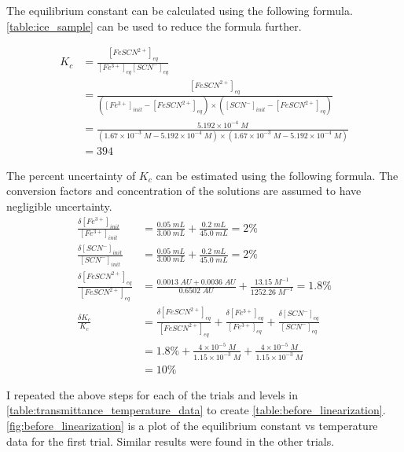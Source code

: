 \noindent
The equilibrium constant can be calculated using the following formula. \cref{table:ice_sample} can be used to reduce the formula further.

\begin{align}
    K_c &= \frac{[FeSCN^{2+}]_{eq}}{[Fe^{3+}]_{eq} [SCN^-]_{eq}} \\
    &= \frac{[FeSCN^{2+}]_{eq}}{([Fe^{3+}]_{init} - [FeSCN^{2+}]_{eq}) \times ([SCN^-]_{init} - [FeSCN^{2+}]_{eq})} \\
    &= \frac{5.192 \times 10^{-4} \; M}{(1.67 \times 10^{-3} \; M - 5.192 \times 10^{-4} \; M) \times (1.67 \times 10^{-3} \; M - 5.192 \times 10^{-4} \; M)} \\
    &= 394
\end{align}

\noindent
The percent uncertainty of \(K_c\) can be estimated using the following formula. The conversion factors and concentration of the solutions are assumed to have negligible uncertainty.
\begin{align}
    \frac{\delta [Fe^{3+}]_{init}}{[Fe^{3+}]_{init}} &= \frac{0.05 \; mL}{3.00 \; mL} + \frac{0.2 \; mL}{45.0 \; mL} = 2\% \\
    \frac{\delta [SCN^-]_{init}}{[SCN^-]_{init}} &= \frac{0.05 \; mL}{3.00 \; mL} + \frac{0.2 \; mL}{45.0 \; mL} = 2\% \\
    \frac{\delta [FeSCN^{2+}]_{eq}}{[FeSCN^{2+}]_{eq}} &= \frac{0.0013 \; AU + 0.0036 \; AU}{0.6502 \; AU} + \frac{13.15 \; M^{-1}}{1252.26 \; M^{-1}} = 1.8\% \\
    \frac{\delta K_c}{K_c} &= \frac{\delta [FeSCN^{2+}]_{eq}}{[FeSCN^{2+}]_{eq}} + \frac{\delta [Fe^{3+}]_{eq}}{[Fe^{3+}]_{eq}} + \frac{\delta [SCN^-]_{eq}}{[SCN^-]_{eq}} \\
    &= 1.8 \% + \frac{4 \times 10^{-5} \; M}{1.15 \times 10^{-3} \; M} + \frac{4 \times 10^{-5} \; M}{1.15 \times 10^{-3} \; M} \\
    &= 10\%
\end{align}

\noindent
I repeated the above steps for each of the trials and levels in \cref{table:transmittance_temperature_data} to create \cref{table:before_linearization}. \cref{fig:before_linearization} is a plot of the equilibrium constant vs temperature data for the first trial. Similar results were found in the other trials.

